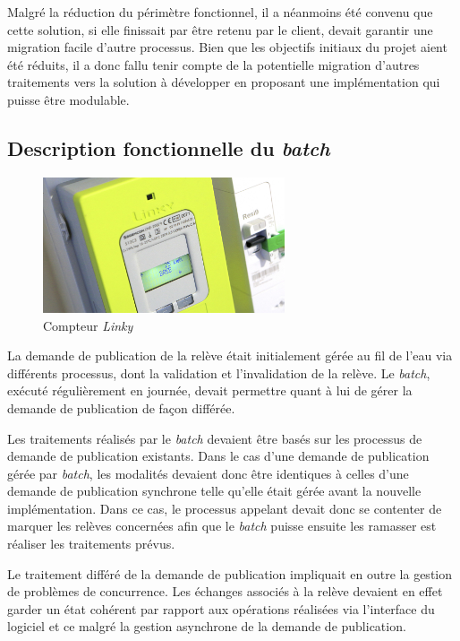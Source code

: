\documentclass[a4paper, 12pt]{report}
\begin{document}
Malgré la réduction du périmètre fonctionnel, il a néanmoins été convenu que cette solution, si elle finissait par être retenu par le client, devait garantir une migration facile d'autre processus. Bien que les objectifs initiaux du projet aient été réduits, il a donc fallu tenir compte de la potentielle migration d'autres traitements vers la solution à développer en proposant une implémentation qui puisse être modulable.

\subsection{Description fonctionnelle du \textit{batch}}

\begin{figure}[t]
  \begin{center}
    \includegraphics[height=4cm]{../res/linky.jpg}
    \caption{Compteur \textit{Linky}}
    \label{linky}
  \end{center}
\end{figure}

La demande de publication de la relève était initialement gérée au fil de l'eau via différents processus, dont la validation et l'invalidation de la relève. Le \textit{batch}, exécuté régulièrement en journée, devait permettre quant à lui de gérer la demande de publication de façon différée. 

Les traitements réalisés par le \textit{batch} devaient être basés sur les processus de demande de publication existants. Dans le cas d'une demande de publication gérée par \textit{batch}, les modalités devaient donc être identiques à celles d'une demande de publication synchrone telle qu'elle était gérée avant la nouvelle implémentation. Dans ce cas, le processus appelant devait donc se contenter de marquer les relèves concernées afin que le \textit{batch} puisse ensuite les ramasser est réaliser les traitements prévus.

Le traitement différé de la demande de publication impliquait en outre la gestion de problèmes de concurrence. Les échanges associés à la relève devaient en effet garder un état cohérent par rapport aux opérations réalisées via l'interface du logiciel et ce malgré la gestion asynchrone de la demande de publication.\\
\end{document}
